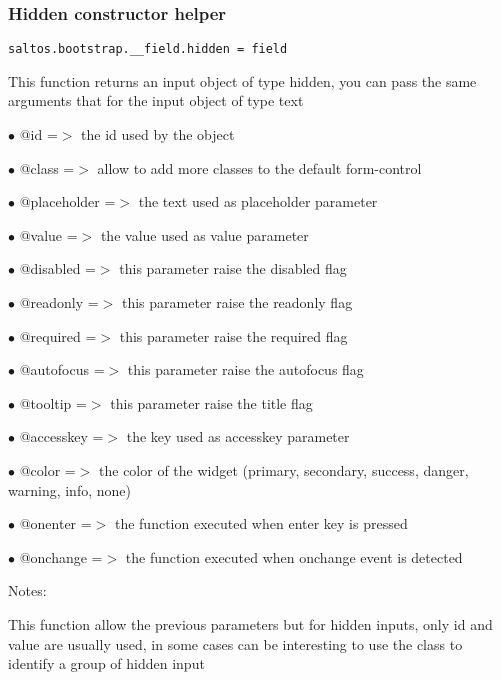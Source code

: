 \documentclass[a4paper]{article}
\begin{document}
\hypertarget{toc609}{}
\subsubsection{Hidden constructor helper}

\begin{lstlisting}
saltos.bootstrap.__field.hidden = field
\end{lstlisting}

This function returns an input object of type hidden, you can pass the same arguments
that for the input object of type text

\begin{compactitem}
\item[\color{myblue}$\bullet$] @id          =$>$ the id used by the object
\item[\color{myblue}$\bullet$] @class       =$>$ allow to add more classes to the default form-control
\item[\color{myblue}$\bullet$] @placeholder =$>$ the text used as placeholder parameter
\item[\color{myblue}$\bullet$] @value       =$>$ the value used as value parameter
\item[\color{myblue}$\bullet$] @disabled    =$>$ this parameter raise the disabled flag
\item[\color{myblue}$\bullet$] @readonly    =$>$ this parameter raise the readonly flag
\item[\color{myblue}$\bullet$] @required    =$>$ this parameter raise the required flag
\item[\color{myblue}$\bullet$] @autofocus   =$>$ this parameter raise the autofocus flag
\item[\color{myblue}$\bullet$] @tooltip     =$>$ this parameter raise the title flag
\item[\color{myblue}$\bullet$] @accesskey   =$>$ the key used as accesskey parameter
\item[\color{myblue}$\bullet$] @color       =$>$ the color of the widget (primary, secondary, success, danger, warning, info, none)
\item[\color{myblue}$\bullet$] @onenter     =$>$ the function executed when enter key is pressed
\item[\color{myblue}$\bullet$] @onchange    =$>$ the function executed when onchange event is detected
\end{compactitem}

Notes:

This function allow the previous parameters but for hidden inputs, only id
and value are usually used, in some cases can be interesting to use the
class to identify a group of hidden input
\end{document}
